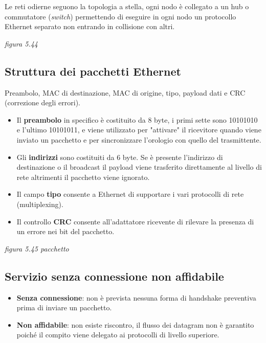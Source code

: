 \documentclass[
]{article}
\begin{document}
Le reti odierne seguono la topologia a stella, ogni nodo è collegato a
un hub o commutatore (\emph{switch}) permettendo di eseguire in ogni
nodo un protocollo Ethernet separato non entrando in collisione con
altri.

\emph{figura 5.44}

\hypertarget{header-n149}{%
\subsection{Struttura dei pacchetti Ethernet}\label{header-n149}}

Preambolo, MAC di destinazione, MAC di origine, tipo, payload dati e CRC
(correzione degli errori).

\begin{itemize}
\item
  Il \textbf{preambolo} in specifico è costituito da 8 byte, i primi
  sette sono 10101010 e l'ultimo 10101011, e viene utilizzato per
  "attivare" il ricevitore quando viene inviato un pacchetto e per
  sincronizzare l'orologio con quello del trasmittente.
\item
  Gli \textbf{indirizzi} sono costituiti da 6 byte. Se è presente
  l'indirizzo di destinazione o il broadcast il payload viene trasferito
  direttamente al livello di rete altrimenti il pacchetto viene
  ignorato.
\item
  Il campo \textbf{tipo} consente a Ethernet di supportare i vari
  protocolli di rete (multiplexing).
\item
  Il controllo \textbf{CRC} consente all'adattatore ricevente di
  rilevare la presenza di un errore nei bit del pacchetto.
\end{itemize}

\emph{figura 5.45 pacchetto}

\hypertarget{header-n161}{%
\subsection{Servizio senza connessione non
affidabile}\label{header-n161}}

\begin{itemize}
\item
  \textbf{Senza connessione}: non è prevista nessuna forma di handshake
  preventiva prima di inviare un pacchetto.
\item
  \textbf{Non affidabile}: non esiste riscontro, il flusso dei datagram
  non è garantito poiché il compito viene delegato ai protocolli di
  livello superiore.
\end{itemize}
\end{document}
